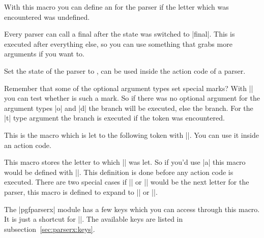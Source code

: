 \begin{command}
  {\pgfparserxdefunknown{}}
  With this macro you can define an  for the 
  parser if the letter which was encountered was undefined.
\end{command}

\begin{command}{\pgfparserxdeffinal{}}
  Every parser can call a final  after the state was switched to
  |final|. This  is executed after everything else, so you can use
  something that grabs more arguments if you want to.
\end{command}

\begin{command}{\pgfparserxstate{}}
  Set the state of the parser to , can be used inside the action
  code of a parser.
\end{command}

\begin{command}{\ifpgfparserxmark{}}
  Remember that some of the optional argument types set special marks? With
  |\ifpgfparserxmark| you can test whether  is such a mark. So if
  there was no optional argument for the argument types |o| and |d| the
   branch will be executed, else the  branch. For the |t|
  type argument the  branch is executed if the token was encountered.
\end{command}

\begin{command}{\pgfparserxtoken}
  This is the macro which is let to the following token with |\futurelet|. You
  can use it inside an action code.
\end{command}

\begin{command}{\pgfparserxletter}
  This macro stores the letter to which |\pgfparserxtoken| was let. So if
  you'd use |a| this macro would be defined with
  |\def\pgfparserxletter{a}|. This definition is done before any action code is
  executed. There are two special cases if |{| or |}| would be the next
  letter for the parser, this macro is defined to expand to |\bgroup| or
  |\egroup|.
\end{command}

\begin{command}{\pgfparserxset{}}
  The |pgfparserx| module has a few keys which you can access through this
  macro. It is just a shortcut for ||. The available
  keys are listed in subsection~\ref{sec:parserx:keys}.
\end{command}

